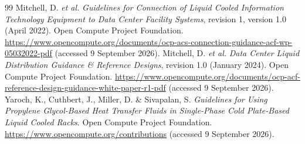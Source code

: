 \documentclass[review,12pt]{elsarticle}
\begin{document}
\begin{thebibliography}{99}
 Mitchell, D. \textit{et al.} \textit{Guidelines for Connection of Liquid Cooled Information Technology Equipment to Data Center Facility Systems}, revision 1, version 1.0 (April 2022). Open Compute Project Foundation. \url{https://www.opencompute.org/documents/ocp-acs-connection-guidance-acf-wp-05032022-pdf} (accessed 9 September 2026).
 Mitchell, D. \textit{et al.} \textit{Data Center Liquid Distribution Guidance \& Reference Designs}, revision 1.0 (January 2024). Open Compute Project Foundation. \url{https://www.opencompute.org/documents/ocp-acf-reference-design-guidance-white-paper-r1-pdf} (accessed 9 September 2026).
 Yaroch, K., Cuthbert, J., Miller, D. \& Sivapalan, S. \textit{Guidelines for Using Propylene Glycol-Based Heat Transfer Fluids in Single-Phase Cold Plate-Based Liquid Cooled Racks}. Open Compute Project Foundation. \url{https://www.opencompute.org/contributions} (accessed 9 September 2026).
\end{thebibliography}
\end{document}

